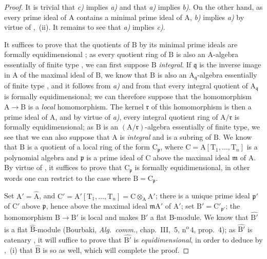 \begin{proof}
It is trivial that \emph{c)} implies \emph{a)} and that \emph{a)} implies \emph{b)}.
On the other hand, as every prime ideal of $\mathrm{A}$ contains a minimal prime ideal of $\mathrm{A}$, \emph{b)} implies \emph{a)} by virtue of ,~(ii).
It remains to see that \emph{a)} implies \emph{c)}.

It suffices to prove that the quotients of $\mathrm{B}$ by its minimal prime ideals are formally equidimensional ; as every quotient ring of $\mathrm{B}$ is also an A-algebra essentially of finite type , we can first suppose $\mathrm{B}$ \emph{integral}.
If $\mathfrak{q}$ is the inverse image in $\mathrm{A}$ of the maximal ideal of $\mathrm{B}$, we know that $\mathrm{B}$ is also an $\mathrm{A}_\mathfrak{q}$-algebra essentially of finite type , and it follows from \emph{a)} and from  that every integral quotient of $\mathrm{A}_\mathfrak{q}$ is formally equidimensional; we can therefore suppose that the homomorphism $\mathrm{A}\to\mathrm{B}$ is a \emph{local} homomorphism.
The kernel $\mathfrak{r}$ of this homomorphism is then a prime ideal of $\mathrm{A}$, and by virtue of \emph{a)}, every integral quotient ring of $\mathrm{A}/\mathfrak{r}$ is formally equidimensional; as $\mathrm{B}$ is an $(\mathrm{A}/\mathfrak{r})$-algebra essentially of finite type, we see that we can also suppose
that $\mathrm{A}$ is \emph{integral} and is a subring of $\mathrm{B}$.
We know  that $\mathrm{B}$ is a quotient of a local ring of the form $\mathrm{C}_\mathfrak{p}$, where $\mathrm{C}=\mathrm{A}[\mathrm{T}_1,\ldots,\mathrm{T}_n]$ is a polynomial algebra and $\mathfrak{p}$ is a prime ideal of $\mathrm{C}$ above the maximal ideal $\mathfrak{m}$ of $\mathrm{A}$.
By virtue of , it suffices to prove that $\mathrm{C}_\mathfrak{p}$ is formally equidimensional, in other words one can restrict to the case where $\mathrm{B}=\mathrm{C}_\mathfrak{p}$.

Set $\mathrm{A}'=\widehat{\mathrm{A}}$, and $\mathrm{C}'=\mathrm{A}'[\mathrm{T}_1,\ldots,\mathrm{T}_n]=\mathrm{C}\otimes_\mathrm{A}\mathrm{A}'$; there is a unique prime ideal $\mathfrak{p}'$ of $\mathrm{C}'$ above $\mathfrak{p}$, hence above the maximal ideal $\mathfrak{m}\mathrm{A}'$ of $\mathrm{A}'$; set $\mathrm{B}'=\mathrm{C}'_{\mathfrak{p}'}$; the homomorphism $\mathrm{B}\to\mathrm{B}'$ is local and makes $\mathrm{B}'$ a flat B-module.
We know that $\widehat{\mathrm{B}'}$ is a flat $\widehat{\mathrm{B}}$-module (Bourbaki, \emph{Alg.\ comm.}, chap.~III, \textsection\,5, n\textsuperscript{o}\,4, prop.~4); as $\widehat{\mathrm{B}'}$ is catenary , it will suffice to prove that $\widehat{\mathrm{B}'}$ is \emph{equidimensional}, in order to deduce by ,~(i) that $\widehat{\mathrm{B}}$ is so as well, which will complete the proof.


\end{proof}
